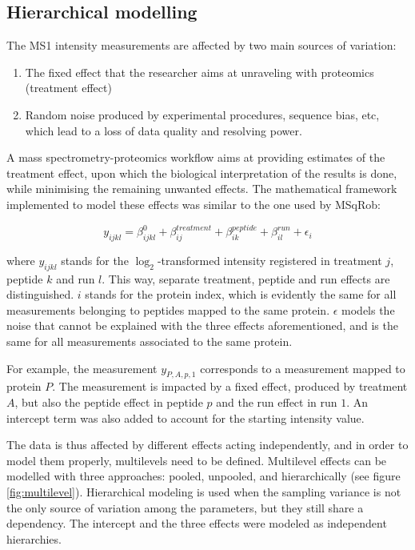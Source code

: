 \subsection{Hierarchical modelling}
\label{subsec:hierarchy}


The \ac{MS1} intensity measurements are affected by two main sources of variation:

\begin{enumerate}
\item The fixed effect that the researcher aims at unraveling with proteomics (treatment effect)
\item Random noise produced by experimental procedures, sequence bias, etc, which lead to a loss of data quality and resolving power.
\end{enumerate}


A mass spectrometry-proteomics workflow aims at providing estimates of the treatment effect, upon which the biological interpretation of the results is done, while minimising the remaining unwanted effects. The mathematical framework implemented to model these effects was similar to the one used by MSqRob:

\begin{equation}\label{eq:model}
y_{ijkl} = \beta_{ijkl}^{0} + \beta_{ij}^{treatment} + \beta_{ik}^{peptide} + \beta_{il}^{run} + \epsilon_{i}
\end{equation}

where $y_{ijkl}$ stands for the $\log_2$-transformed intensity registered in treatment $j$, peptide $k$ and run $l$. This way, separate treatment, peptide and run effects are distinguished. $i$ stands for the protein index, which is evidently the same for all measurements belonging to peptides mapped to the same protein. $\epsilon$ models the noise that cannot be explained with the three effects aforementioned, and is the same for all measurements associated to the same protein.

For example, the measurement $y_{P,A,p,1}$ corresponds to a measurement mapped to protein $P$. The measurement is impacted by a fixed effect, produced by treatment $A$, but also the peptide effect in peptide $p$ and the run effect in run $1$. An intercept term was also added to account for the starting intensity value.

The data is thus affected by different effects acting independently, and in order to model them properly, multilevels need to be defined. Multilevel effects can be modelled with three approaches: pooled, unpooled, and hierarchically (see figure \ref{fig:multilevel}). Hierarchical modeling is used when the sampling variance is not the only source of variation among the parameters, but they still share a dependency. The intercept and the three effects were modeled as independent hierarchies.

